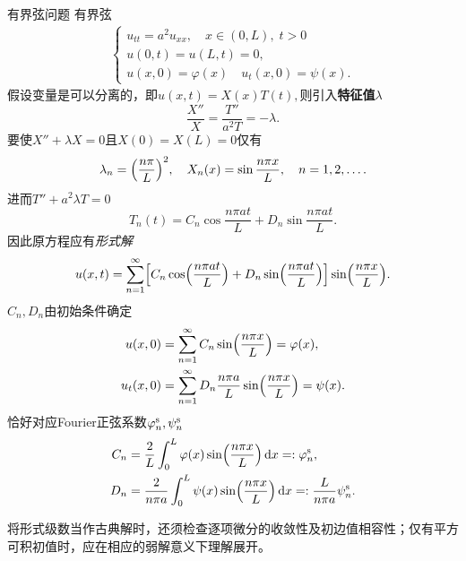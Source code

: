 \begin{example}{有界弦问题}{}
	有界弦
	\begin{align*}
		\begin{cases}
			u_{tt} = a^2u_{xx},\quad x \in (0,L),\;t > 0 \\
			u(0,t) = u(L,t) = 0,                 \\
			u(x,0) = \varphi(x)\quad u_t(x,0) = \psi(x).
		\end{cases}
	\end{align*}
	假设变量是可以分离的，即$u(x,t) = X(x)T(t),$则引入\textbf{特征值}$\lambda$
	\[
		\frac{X''}X = \frac{T''}{a^2T} = -\lambda.
	\]
	要使$X'' + \lambda X = 0$且$X(0) = X(L) = 0$仅有
	\begin{equation}
		\label{eq:mmp-string-dirichlet-eigenpairs}
		\lambda_n = \Bigl(\frac{n\pi}L\Bigr)^2,\quad X_n(x) = \sin\frac{n\pi x}L,\quad n = 1,2,\ldots.
	\end{equation}
	进而$T'' + a^2\lambda T = 0$
	\[
		T_n(t) = C_n\cos\frac{n\pi at}L + D_n\sin\frac{n\pi at}L.
	\]
	因此原方程应有\textit{形式解}
	\begin{align}
		u(x,t) = \sum_{n=1}^\infty\Bigl[C_n\cos\Bigl(\frac{n\pi at}L\Bigr) + D_n\sin\Bigl(\frac{n\pi at}L\Bigr)\Bigr]\sin\Bigl(\frac{n\pi x}L\Bigr).
	\end{align}
	$C_n,D_n$由初始条件确定
	\begin{align*}
		u(x,0) &= \sum_{n=1}^\infty C_n\sin\Bigl(\frac{n\pi x}L\Bigr) = \varphi(x),            \\
		u_t(x,0) &= \sum_{n=1}^\infty D_n\frac{n\pi a}L\sin\Bigl(\frac{n\pi x}L\Bigr) = \psi(x).
	\end{align*}
	恰好对应Fourier正弦系数$\varphi^{\mathrm s}_n,\psi^{\mathrm s}_n$
	\begin{subequations}
		\label{eq:mmp-string-mode-coefficients}
		\begin{align}
			C_n & = \frac2L\int_0^L\varphi(x)\sin\Bigl(\frac{n\pi x}L\Bigr)\mathop{}\!\mathrm{d} x =: \varphi_n^{\mathrm s},                  \\
			D_n & = \frac2{n\pi a}\int_0^L\psi(x)\sin\Bigl(\frac{n\pi x}L\Bigr)\mathop{}\!\mathrm{d} x =: \frac{L}{n\pi a}\psi_n^{\mathrm s}.
		\end{align}
	\end{subequations}
	
	将形式级数当作古典解时，还须检查逐项微分的收敛性及初边值相容性；仅有平方可积初值时，应在相应的弱解意义下理解展开。
\end{example}
